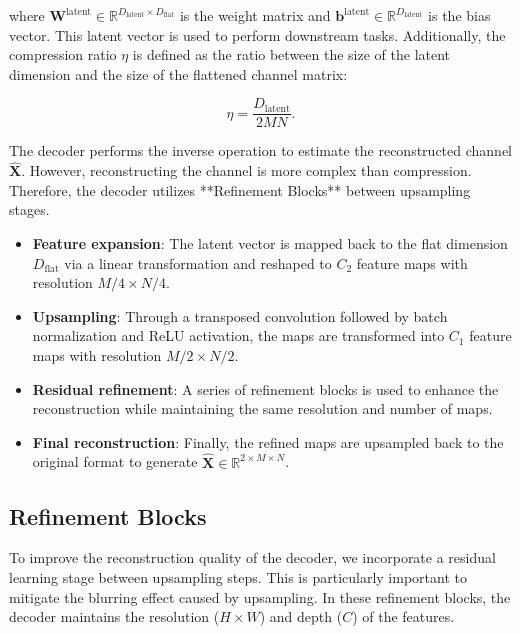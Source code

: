 where $\mathbf{W}^{\text{latent}} \in \mathbb{R}^{D_{\text{latent}} \times D_{\text{flat}}}$ is the weight matrix and $\mathbf{b}^{\text{latent}} \in \mathbb{R}^{D_{\text{latent}}}$ is the bias vector. This latent vector is used to perform downstream tasks. Additionally, the compression ratio $\eta$ is defined as the ratio between the size of the latent dimension and the size of the flattened channel matrix:

\begin{equation}
    \eta = \frac{D_{\text{latent}}}{2 M N}.
\end{equation}

The decoder performs the inverse operation to estimate the reconstructed channel $\hat{\mathbf{X}}$.
However, reconstructing the channel is more complex than compression. Therefore, the decoder utilizes **Refinement Blocks** between upsampling stages.

\begin{itemize}
    \item \textbf{Feature expansion}: The latent vector is mapped back to the flat dimension $D_{\text{flat}}$ via a linear transformation and reshaped to $C_2$ feature maps with resolution $M/4 \times N/4$.
    \item \textbf{Upsampling}: Through a transposed convolution followed by batch normalization and ReLU activation, the maps are transformed into $C_1$ feature maps with resolution $M/2 \times N/2$.
    \item \textbf{Residual refinement}: A series of refinement blocks is used to enhance the reconstruction while maintaining the same resolution and number of maps.
    \item \textbf{Final reconstruction}: Finally, the refined maps are upsampled back to the original format to generate $\hat{\mathbf{X}} \in \mathbb{R}^{2 \times M \times N}$.
\end{itemize}

\subsection{Refinement Blocks}\label{sec:autoencoder_refinement_blocks}

To improve the reconstruction quality of the decoder, we incorporate a residual learning stage between upsampling steps. This is particularly important to mitigate the blurring effect caused by upsampling. In these refinement blocks, the decoder maintains the resolution ($H \times W$) and depth ($C$) of the features.


